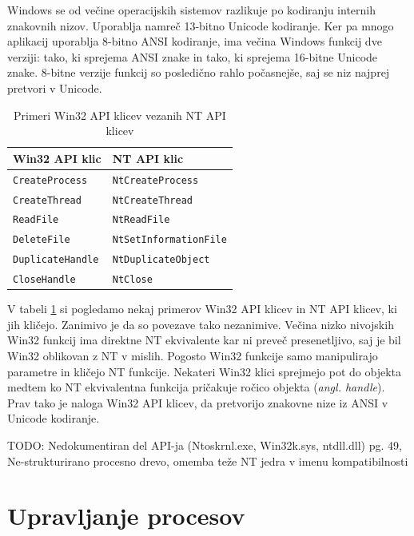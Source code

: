 \documentclass[a4paper,12pt,openright]{book}
\begin{document}
Windows se od večine operacijskih sistemov razlikuje po kodiranju internih znakovnih nizov. Uporablja namreč 13-bitno Unicode kodiranje.
Ker pa mnogo aplikacij uporablja 8-bitno ANSI kodiranje, ima večina Windows funkcij dve verziji: tako, ki sprejema ANSI znake in tako, ki sprejema 16-bitne Unicode znake.
8-bitne verzije funkcij so posledično rahlo počasnejše, saj se niz najprej pretvori v Unicode.
\cite{Yosifovich_Russinovich_Solomon_Ionescu_2017}

\begin{table}[h!]
	\begin{center}
		\begin{tabular}{ l|l }
			Win32 API klic         & NT API klic                 \\
			\hline
			\verb|CreateProcess|   & \verb|NtCreateProcess|      \\
			\verb|CreateThread|    & \verb|NtCreateThread|       \\
			\verb|ReadFile|        & \verb|NtReadFile|           \\
			\verb|DeleteFile|      & \verb|NtSetInformationFile| \\
			\verb|DuplicateHandle| & \verb|NtDuplicateObject|    \\
			\verb|CloseHandle|     & \verb|NtClose|              \\
		\end{tabular}
	\end{center}
	\caption{Primeri Win32 API klicev vezanih NT API klicev \cite{Tanenbaum_Bos_2023}}
	\label{tab:example_win32_nt_mapping}
\end{table}

V tabeli \ref{tab:example_win32_nt_mapping} si pogledamo nekaj primerov Win32 API klicev in NT API klicev, ki jih kličejo.
Zanimivo je da so povezave tako nezanimive.
Večina nizko nivojskih Win32 funkcij ima direktne NT ekvivalente kar ni preveč presenetljivo, saj je bil Win32 oblikovan z NT v mislih.
Pogosto Win32 funkcije samo manipulirajo parametre in kličejo NT funkcije.
Nekateri Win32 klici sprejmejo pot do objekta medtem ko NT ekvivalentna funkcija pričakuje ročico objekta (\textit{angl. handle}).
Prav tako je naloga Win32 API klicev, da pretvorijo znakovne nize iz ANSI v Unicode kodiranje.
\cite{Tanenbaum_Bos_2023}

TODO: Nedokumentiran del API-ja (Ntoskrnl.exe, Win32k.sys, ntdll.dll) pg. 49, Ne-strukturirano procesno drevo, omemba teže NT jedra v imenu kompatibilnosti

\chapter{Upravljanje procesov} \label{sec:process_control}
\end{document}
